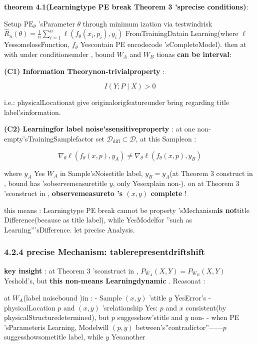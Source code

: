 \documentclass[
  12pt,
]{article}
\begin{document}
\textbf{theorem  4.1(Learningtype  PE break  Theorem 3 'sprecise conditions)}: 

Setup \(\text{PE}_\theta\) 'sParameter \(\theta\) through minimum ization via testwindrisk
\(\hat{R}_n(\theta) = \frac{1}{n}\sum_{i=1}^{n} \ell(f_\theta(x_i, p_i), y_i)\)
FromTrainingDatain Learning(where \(\ell\) YessomelossFunction, \(f_\theta\) Yescontain PE
encodecode 'sCompleteModel). then at with under conditionsunder , bound  \(W_A\) and  \(W_B\)
tionas \textbf{can be interval}: 

\textbf{(C1) Information Theorynon-trivialproperty }: 

\[I(Y; P \mid X) > 0\]

i.e.: physicalLocationat give originalorigfeatureunder bring regarding title label'sinformation. 

\textbf{(C2) Learningfor label noise'ssensitiveproperty }: at one non-empty'sTrainingSamplefactor set 
\(\mathcal{D}_{\text{diff}} \subset \mathcal{D}\), at this Sampleon : 

\[\nabla_\theta \ell(f_\theta(x, p), y_A) \neq \nabla_\theta \ell(f_\theta(x, p), y_B)\]

where \(y_A\) Yes \(W_A\) in Sample'sNoisetitle label, \(y_B = y_A\)(at  Theorem 3
construct in , bound has 'sobservemeasuretitle \(y\), only Yesexplain non-). on at  Theorem
3 'sconstruct in , \textbf{observemeasureto 's \((x, y)\) complete }!

this means : Learningtype  PE
break cannot be property 'sMechanism\textbf{is not}title Difference(because as title label), while YesModelfor ''such as Learning'''sDifference. let precise Analysis. 

\subsubsection{4.2.4
precise Mechanism: tablerepresentdriftshift}\label{ux7cbeux786eux673aux5236ux8868ux5f81ux6f02ux79fb}

\textbf{key insight }: at  Theorem 3
'sconstruct in , \(P_{W_A}(X, Y) = P_{W_B}(X, Y)\)
Yeshold's, but \textbf{this non-means Learningdynamic }. Reasonat : 

at  \(W_A\)(label noisebound )in :  - Sample \((x, y)\) 'stitle  \(y\) YesError's -
physicalLocation \(p\) and  \((x, y)\) 'srelationship Yes: \(p\) and  \(x\)
consistent(by physicalStructuredetermined), but  \(p\) suggesshow'stitle and  \(y\) non- - when  PE
'sParameteris Learning, Modelwill  \((p, y)\) between's''contradictor''------\(p\)
suggesshowsometitle label, while  \(y\) Yesanother 
\end{document}
